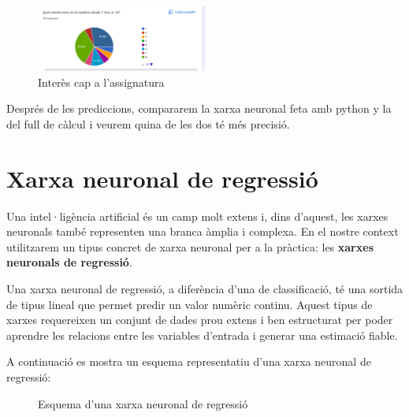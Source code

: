 \begin{figure}[H]
    \centering
    \includegraphics[width=0.5\textwidth]{./figures/20.png}
    \caption{Interès cap a l'assignatura}
\end{figure}



Després de les prediccions, compararem la xarxa neuronal feta amb python y la del full de càlcul i veurem quina de les dos té més precisió.

\section{Xarxa neuronal de regressió}\label{sec:op}
Una intel·ligència artificial és un camp molt extens i, dins d’aquest, les xarxes neuronals també representen una branca àmplia i complexa.
En el nostre context utilitzarem un tipus concret de xarxa neuronal per a la pràctica: les \textbf{xarxes neuronals de regressió}.

Una xarxa neuronal de regressió, a diferència d’una de classificació, té una sortida de tipus lineal que permet predir un valor numèric continu. Aquest tipus de xarxes requereixen un conjunt de dades prou extens i ben estructurat per poder aprendre les relacions entre les variables d’entrada i generar una estimació fiable.

A continuació es mostra un esquema representatiu d’una xarxa neuronal de regressió:

\begin{figure}[h!]
\centering
{}
\caption{Esquema d’una xarxa neuronal de regressió}
\end{figure}

